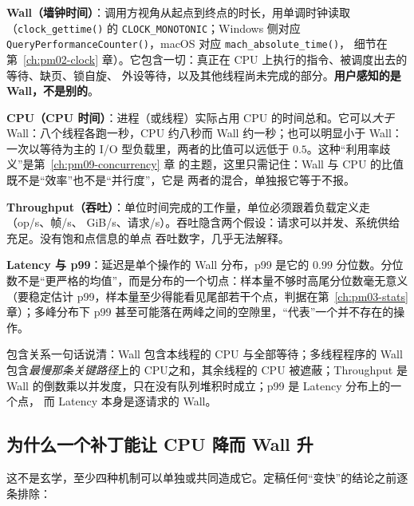 \documentclass[12pt,a4paper,fontset=fandol]{ctexbook}
\newcommand{\Fn}[1]{\texttt{#1()}}
\newcommand{\Tp}[1]{\texttt{#1}}
\newcommand{\Bk}{\discretionary{}{}{}}
\newcommand{\Lang}[1]{\textsf{#1}}
\newcommand{\MWall}{\Lang{Wall}}
\newcommand{\MCpu}{\Lang{CPU}}
\newcommand{\MLat}{\Lang{Latency}}
\newcommand{\MThr}{\Lang{Throughput}}
\newcommand{\Mx}[1]{\textsf{#1}}
\begin{document}
\textbf{\MWall{}（墙钟时间）}：调用方视角从起点到终点的时长，用单调时钟读取
（\Fn{clock{\Bk}\_gettime} 的 \Tp{CLOCK{\Bk}\_MONOTONIC}；Windows 侧对应
\Fn{Query{\Bk}Performance{\Bk}Counter}，macOS 对应 \Fn{mach{\Bk}\_absolute{\Bk}\_time}，
细节在第~\ref{ch:pm02-clock} 章）。它包含一切：真正在 CPU 上执行的指令、被调度出去的等待、缺页、锁自旋、
外设等待，以及其他线程尚未完成的部分。\textbf{用户感知的是 \MWall，不是别的}。

\textbf{\MCpu{}（CPU 时间）}：进程（或线程）实际占用 CPU 的时间总和。它可以\emph{大于}
\MWall：八个线程各跑一秒，\MCpu{} 约八秒而 \MWall{} 约一秒；也可以明显小于 \MWall：
一次以等待为主的 I/O 型负载里，两者的比值可以远低于 $0.5$。这种``利用率歧义''是第~\ref{ch:pm09-concurrency} 章
的主题，这里只需记住：\MWall{} 与 \MCpu{} 的比值既不是``效率''也不是``并行度''，它是
两者的混合，单独报它等于不报。

\textbf{\MThr{}（吞吐）}：单位时间完成的工作量，单位必须跟着负载定义走（op/s、帧/s、
GiB/s、请求/s）。吞吐隐含两个假设：请求可以并发、系统供给充足。没有饱和点信息的单点
吞吐数字，几乎无法解释。

\textbf{\MLat{} 与 \Mx{p99}}：延迟是单个操作的 \MWall{} 分布，\Mx{p99} 是它的 $0.99$
分位数。分位数不是``更严格的均值''，而是分布的一个切点：样本量不够时高尾分位数毫无意义
（要稳定估计 \Mx{p99}，样本量至少得能看见尾部若干个点，判据在第~\ref{ch:pm03-stats} 章）；多峰分布下
\Mx{p99} 甚至可能落在两峰之间的空隙里，``代表''一个并不存在的操作。

包含关系一句话说清：\MWall{} 包含本线程的 \MCpu{} 与全部等待；多线程程序的 \MWall{}
包含\emph{最慢那条关键路径}上的 \MCpu 之和，其余线程的 \MCpu{} 被遮蔽；\MThr{} 是
\MWall{} 的倒数乘以并发度，只在没有队列堆积时成立；\Mx{p99} 是 \MLat{} 分布上的一个点，
而 \MLat{} 本身是逐请求的 \MWall。

\subsection{为什么一个补丁能让 \MCpu{} 降而 \MWall{} 升}
\label{sub:pm01-diverge}

这不是玄学，至少四种机制可以单独或共同造成它。定稿任何``变快''的结论之前逐条排除：
\end{document}
